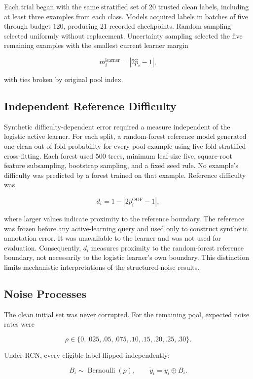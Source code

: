 \documentclass[11pt]{article}
\begin{document}
Each trial began with the same stratified set of 20 trusted clean labels,
including at least three examples from each class. Models acquired labels in
batches of five through budget 120, producing 21 recorded checkpoints.
Random sampling selected uniformly without replacement. Uncertainty sampling
selected the five remaining examples with the smallest current learner margin

\[
m_i^{\text{learner}}=\left|2\widehat p_i-1\right|,
\]

with ties broken by original pool index.

\subsection{Independent Reference Difficulty}

Synthetic difficulty-dependent error required a measure independent of
the logistic active learner. For each split, a random-forest reference model
generated one clean out-of-fold probability for every pool example using
five-fold stratified cross-fitting. Each forest used 500 trees, minimum leaf
size five, square-root feature subsampling, bootstrap sampling, and a fixed
seed rule. No example's difficulty was predicted by a forest trained on that
example. Reference difficulty was

\[
d_i=1-\left|2p_i^{\mathrm{OOF}}-1\right|,
\]

where larger values indicate proximity to the reference boundary. The
reference was frozen before any active-learning query and used only to
construct synthetic annotation error. It was unavailable to the learner and
was not used for evaluation. Consequently, $d_i$ measures proximity to the
random-forest reference boundary, not necessarily to the logistic learner's
own boundary. This distinction limits mechanistic interpretations of the
structured-noise results.

\subsection{Noise Processes}

The clean initial set was never corrupted. For the remaining pool, expected
noise rates were

\[
\rho\in\{0,.025,.05,.075,.10,.15,.20,.25,.30\}.
\]

Under RCN, every eligible label flipped independently:

\[
B_i\sim\operatorname{Bernoulli}(\rho), \qquad
\widetilde y_i=y_i\oplus B_i.
\]
\end{document}
